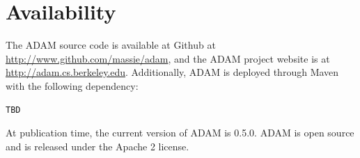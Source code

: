 \documentclass[10pt,twocolumn]{article}
\begin{document}
\section{Availability}
\label{sec:availability}

The ADAM source code is available at Github at \url{http://www.github.com/massie/adam}, and the ADAM project website
is at \url{http://adam.cs.berkeley.edu}. Additionally, ADAM is deployed through Maven with the following dependency:

\begin{verbatim}
TBD
\end{verbatim}

At publication time, the current version of ADAM is 0.5.0. ADAM is open source and is released under the Apache 2
license.





\clearpage
\end{document}
